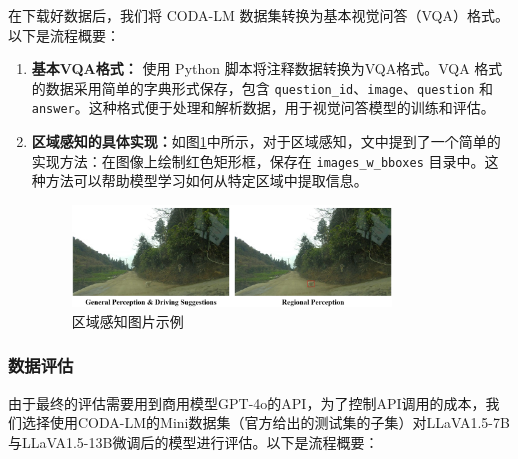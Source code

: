 \documentclass[
    linespread = 1.25
]{ctexart}
\begin{document}
在下载好数据后，我们将 CODA-LM 数据集转换为基本视觉问答（VQA）格式。以下是流程概要：

\begin{enumerate}

  \item \textbf{基本VQA格式：}
        使用 Python 脚本将注释数据转换为VQA格式。VQA 格式的数据采用简单的字典形式保存，包含 \texttt{question\_id}、\texttt{image}、\texttt{question} 和 \texttt{answer}。这种格式便于处理和解析数据，用于视觉问答模型的训练和评估。


  \item \textbf{区域感知的具体实现：}如图\ref{fig:example}中所示，对于区域感知，文中提到了一个简单的实现方法：在图像上绘制红色矩形框，保存在 \texttt{images\_w\_bboxes} 目录中。这种方法可以帮助模型学习如何从特定区域中提取信息。

        \begin{figure}[h] %
          \centering %
          \includegraphics[width=0.8\textwidth]{visual.png} %
          \caption{区域感知图片示例} %
          \label{fig:example} %
        \end{figure}
\end{enumerate}

\subsubsection{数据评估}
由于最终的评估需要用到商用模型GPT-4o的API，为了控制API调用的成本，我们选择使用CODA-LM的Mini数据集（官方给出的测试集的子集）对LLaVA1.5-7B与LLaVA1.5-13B微调后的模型进行评估。以下是流程概要：
\end{document}

